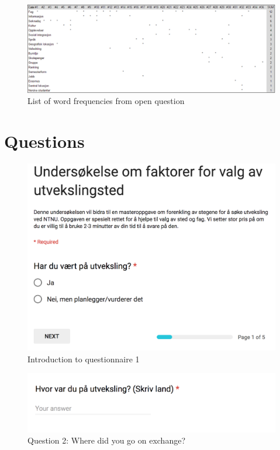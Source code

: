 \FloatBarrier
\label{appendix:word_frequency}

\begin{figure}[h]
    \centering
    \includegraphics[width=1.0\textwidth]{fig/word_freq.png}
    \caption[]{List of word frequencies from open question}
    \label{fig:word_frequency}
\end{figure}

\FloatBarrier
\section{Questions} \label{app:questionnaire1_questions}

\begin{figure}[h]
    \centering
\includegraphics[width=1\textwidth]{fig/form1/intro.png}
    \caption[]{Introduction to questionnaire 1}
    \label{fig:q11}
\end{figure}

\begin{figure}[h]
    \centering
\includegraphics[width=1\textwidth]{fig/form1/where.png}
    \caption[]{Question 2: Where did you go on exchange?}
    \label{fig:q13}
\end{figure}

